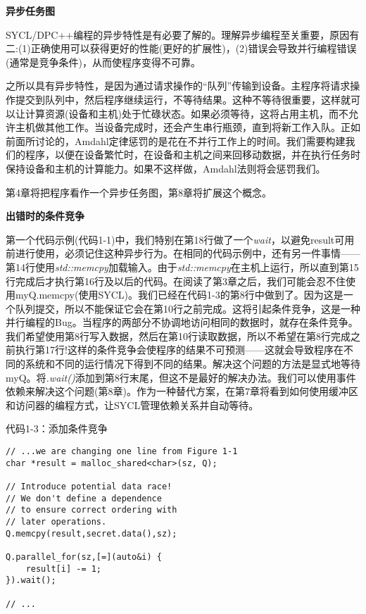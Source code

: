 \hspace*{\fill} \par %
\textbf{异步任务图}

SYCL/DPC++编程的异步特性是有必要了解的。理解异步编程至关重要，原因有二:(1)正确使用可以获得更好的性能(更好的扩展性)，(2)错误会导致并行编程错误(通常是竞争条件)，从而使程序变得不可靠。\par

之所以具有异步特性，是因为通过请求操作的“队列”传输到设备。主程序将请求操作提交到队列中，然后程序继续运行，不等待结果。这种不等待很重要，这样就可以让计算资源(设备和主机)处于忙碌状态。如果必须等待，这将占用主机，而不允许主机做其他工作。当设备完成时，还会产生串行瓶颈，直到将新工作入队。正如前面所讨论的，Amdahl定律惩罚的是花在不并行工作上的时间。我们需要构建我们的程序，以便在设备繁忙时，在设备和主机之间来回移动数据，并在执行任务时保持设备和主机的计算能力。如果不这样做，Amdahl法则将会惩罚我们。\par

第4章将把程序看作一个异步任务图，第8章将扩展这个概念。\par

\hspace*{\fill} \par %
\textbf{出错时的条件竞争}

第一个代码示例(代码1-1)中，我们特别在第18行做了一个\textit{wait}，以避免result可用前进行使用，必须记住这种异步行为。在相同的代码示例中，还有另一件事情——第14行使用\textit{std::memcpy}加载输入。由于\textit{std::memcpy}在主机上运行，所以直到第15行完成后才执行第16行及以后的代码。在阅读了第3章之后，我们可能会忍不住使用myQ.memcpy(使用SYCL)。我们已经在代码1-3的第8行中做到了。因为这是一个队列提交，所以不能保证它会在第10行之前完成。这将引起条件竞争，这是一种并行编程的Bug。当程序的两部分不协调地访问相同的数据时，就存在条件竞争。我们希望使用第8行写入数据，然后在第10行读取数据，所以不希望在第8行完成之前执行第17行!这样的条件竞争会使程序的结果不可预测——这就会导致程序在不同的系统和不同的运行情况下得到不同的结果。解决这个问题的方法是显式地等待myQ。将\textit{.wait()}添加到第8行末尾，但这不是最好的解决办法。我们可以使用事件依赖来解决这个问题(第8章)。作为一种替代方案，在第7章将看到如何使用缓冲区和访问器的编程方式，让SYCL管理依赖关系并自动等待。\par

代码1-3：添加条件竞争
\begin{lstlisting}[caption={}]
// ...we are changing one line from Figure 1-1
char *result = malloc_shared<char>(sz, Q);

// Introduce potential data race!
// We don't define a dependence
// to ensure correct ordering with
// later operations.
Q.memcpy(result,secret.data(),sz);

Q.parallel_for(sz,[=](auto&i) {
	result[i] -= 1;
}).wait();

// ...
\end{lstlisting}

